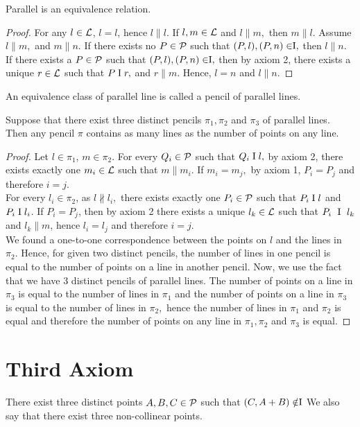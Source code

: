 \begin{theorem}
    Parallel is an equivalence relation.
\end{theorem}
\begin{proof}
    For any $l \in \mathcal{L}$, $l=l$, hence $l \parallel l.$ If $l,m \in \mathcal{L}$ and $l \parallel m,$ then $m \parallel l.$ Assume $l \parallel m,$ and $m \parallel n$. If there exists no $P \in \mathcal{P}$ such that $(P,l),(P,n) \in \mathrel\text{I},$ then $l \parallel n.$ If there exists a $P \in \mathcal{P}$ such that $(P,l),(P,n) \in \mathrel\text{I},$ then by axiom 2, there exists a unique $r \in \mathcal{L}$ such that $P \mathrel\text{I} r,$ and $ r \parallel m.$ Hence, $l=n$ and $l \parallel n.$
\end{proof}

An equivalence class of parallel line is called a pencil of parallel lines.

\begin{theorem}
    Suppose that there exist three distinct pencils $\pi_1, \pi_2$ and $\pi_3$ of parallel lines. Then any pencil $\pi$ contains as many lines as the number of points on any line.
\end{theorem}
\begin{proof}
    Let $l \in \pi_1$, $m \in \pi_2.$ For every $Q_i \in \mathcal{P}$ such that $Q_i \mathrel\text{I} l,$ by axiom 2, there exists exactly one $m_i \in \mathcal{L}$ such that $m \parallel m_i.$ If $m_i = m_j,$ by axiom 1, $P_i=P_j$ and therefore $i=j.$ \\
    For every $l_i \in \pi_2$, as $l \nparallel l_i,$ there exists exactly one $P_i \in \mathcal{P}$ such that $P_i \mathrel\text{I} l$ and $P_i \mathrel\text{I} l_i$. If $P_i = P_j$, then by axiom 2 there exists a unique $l_k \in \mathcal{L}$ such that $P_i \ \mathrel\text{I} \ l_k$ and $l_k \parallel m$, hence  $l_i=l_j$ and therefore $i=j.$  \\
    We found a one-to-one correspondence between the points on $l$ and the lines in $\pi_2.$ Hence, for given two distinct pencils, the number of lines in one pencil is equal to the number of points on a line in another pencil. Now, we use the fact that we have 3 distinct pencils of parallel lines. The number of points on a line in $\pi_3$ is equal to the number of lines in $\pi_1$ and the number of points on a line in $\pi_3$ is equal to the number of lines in $\pi_2,$ hence the number of lines in $\pi_1$ and $\pi_2$ is equal and therefore the number of points on any line in $\pi_1, \pi_2$ and $\pi_3$ is equal.
\end{proof}

\section{Third Axiom}
\begin{axiom}[3]
    There exist three distinct points $A,B,C \in \mathcal{P}$ such that $(C,A+B) \notin \mathrel\text{I}$ We also say that there exist three non-collinear points.
\end{axiom}

